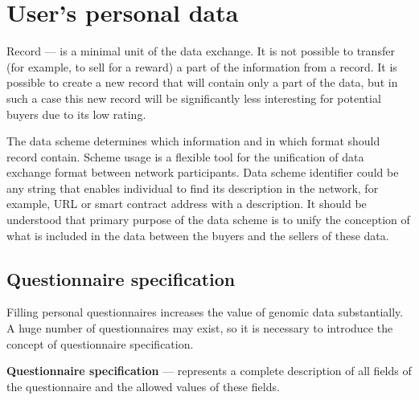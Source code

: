 \section{User’s personal data}


%

Record --- is a minimal unit of the data exchange. It is not possible to transfer (for example, to sell for a reward) a part of the information from a record. It is possible to create a new record that will contain only a part of the data, but in such a case this new record will be significantly less interesting for potential buyers due to its low rating.

The data scheme determines which information and in which format should record contain. Scheme usage is a flexible tool for the unification of data exchange format between network participants. Data scheme identifier could be any string that enables individual to find its description in the network, for example, URL or smart contract address with a description. It should be understood that primary purpose of the data scheme is to unify the conception of what is included in the data between the buyers and the sellers of these data.

\subsection{Questionnaire specification}
Filling personal questionnaires increases the value of genomic data substantially. A huge number of questionnaires may exist, so it is necessary to introduce the concept of questionnaire specification.

\textbf{Questionnaire specification} --- represents a complete description of all fields of the questionnaire and the allowed values of these fields.
%


